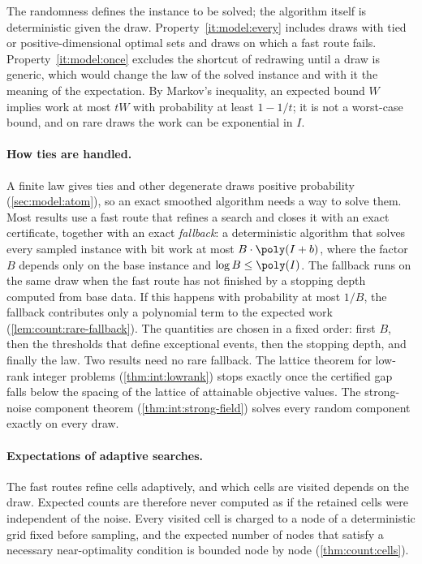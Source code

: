 The randomness defines the instance to be solved; the algorithm itself is
deterministic given the draw. Property~\ref{it:model:every} includes draws
with tied or positive-dimensional optimal sets and draws on which a fast
route fails. Property~\ref{it:model:once} excludes the shortcut of redrawing
until a draw is generic, which would change the law of the solved instance
and with it the meaning of the expectation. By Markov's inequality, an
expected bound $W$ implies work at most $tW$ with probability at least
$1-1/t$; it is not a worst-case bound, and on rare draws the work can be
exponential in $I$.

\paragraph{How ties are handled.}
A finite law gives ties and other degenerate draws positive probability
(\cref{sec:model:atom}), so an exact smoothed algorithm needs a way to
solve them. Most results use a fast route that refines a search and closes
it with an exact certificate, together with an exact \emph{fallback}: a
deterministic algorithm that solves every sampled instance with bit work at
most $B\cdot\poly(I+b)$, where the factor $B$ depends only on the base
instance and $\log B\le\poly(I)$. The fallback runs on the same draw when
the fast route has not finished by a stopping depth computed from base data.
If this happens with probability at most $1/B$, the fallback contributes
only a polynomial term to the expected work
(\cref{lem:count:rare-fallback}). The quantities are chosen in a fixed order:
first $B$, then the thresholds that define exceptional events, then the
stopping depth, and finally the law. Two results need no rare fallback. The
lattice theorem for low-rank integer problems (\cref{thm:int:lowrank}) stops
exactly once the certified gap falls below the spacing of the lattice of
attainable objective values. The strong-noise component theorem
(\cref{thm:int:strong-field}) solves every random component exactly on every
draw.

\paragraph{Expectations of adaptive searches.}
The fast routes refine cells adaptively, and which cells are visited
depends on the draw. Expected counts are therefore never computed as if the
retained cells were independent of the noise. Every visited cell is charged
to a node of a deterministic grid fixed before sampling, and the expected
number of nodes that satisfy a necessary near-optimality condition is
bounded node by node (\cref{thm:count:cells}).

